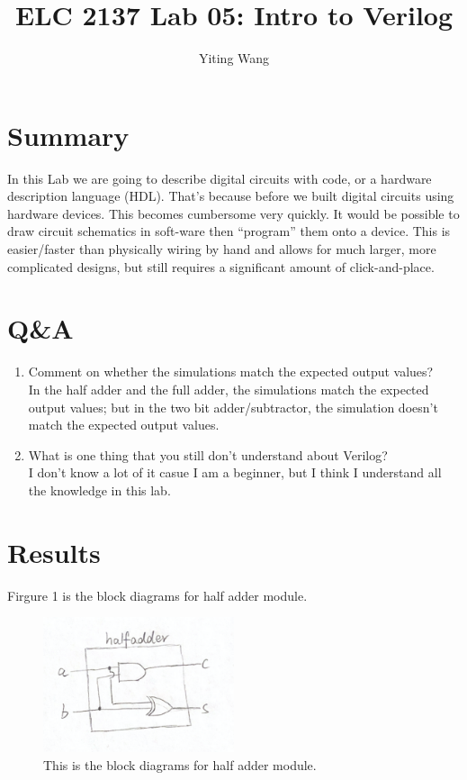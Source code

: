 \documentclass[11pt]{article}
\begin{document}
\title{ELC 2137 Lab 05: Intro to Verilog}
\author{Yiting Wang}

\maketitle


\section*{Summary}

In this Lab we are going to describe digital circuits with code,  or a  hardware description language  (HDL). That's because before we built digital circuits using hardware devices.  This becomes cumbersome very quickly.  It would be possible to draw circuit schematics in soft-ware then “program” them onto a device.  This is easier/faster than physically wiring by hand and allows for much larger, more complicated designs, but still requires a significant amount of click-and-place. \\



\section*{Q\&A}

\begin{enumerate}
	\item Comment on whether the simulations match the expected output values? \\
	In the half adder and the full adder, the simulations match the expected output values; but in the two bit adder/subtractor, the simulation doesn't match the expected output values. \\
	\item What is one thing that you still don’t understand about Verilog? \\
	I don't know a lot of it casue I am a beginner, but I think I understand all the knowledge in this lab. \\
\end{enumerate}



\section*{Results}

Firgure 1 is the block diagrams for half adder module. \\
\begin{figure}[ht]\centering    
	\includegraphics[width=0.5\textwidth]{halfadder}    
	\caption{This is the block diagrams for half adder module.}    
	\label{fig:halfadder}
\end{figure}
\end{document}
